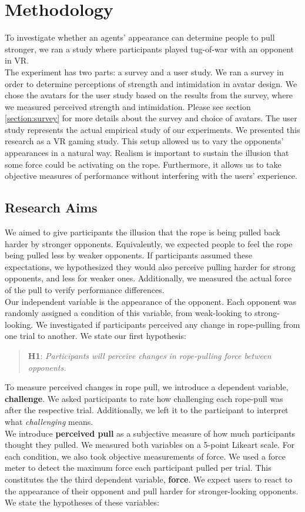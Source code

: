 
\section{Methodology}
\label{section:methodology}
To investigate whether an agents' appearance can determine people to pull stronger, we ran a study where participants played tug-of-war with an opponent in VR.\\
The experiment has two parts: a survey and a user study. We ran a survey in order to determine perceptions of strength and intimidation in avatar design. We chose the avatars for the user study based on the results from the survey, where we measured perceived strength and intimidation. Please see section \ref{section:survey} for more details about the survey and choice of avatars. The user study represents the actual empirical study of our experiments. We presented this research as a VR gaming study. This setup allowed us to vary the opponents' appearances in a natural way. Realism is important to sustain the illusion that some force could be activating on the rope. Furthermore, it allows us to take objective measures of performance without interfering with the users' experience.

\subsection{Research Aims}
We aimed to give participants the illusion that the rope is being pulled back harder by stronger opponents. Equivalently, we expected people to feel the rope being pulled less by weaker opponents. If participants assumed these expectations, we hypothesized they would also perceive pulling harder for strong opponents, and less for weaker ones. Additionally, we measured the actual force of the pull to verify performance differences.
 \\
Our independent variable is the appearance of the opponent. Each opponent was randomly assigned a condition of this variable, from weak-looking to strong-looking. We investigated if participants perceived any change in rope-pulling from one trial to another. We state our first hypothesis:
\begin{quote}
\textbf{H1}: \textit{Participants will perceive changes in rope-pulling force between opponents.}
\end{quote}
To measure perceived changes in rope pull, we introduce a dependent variable, \textbf{challenge}. We asked participants to rate how challenging each rope-pull was after the respective trial. Additionally, we left it to the participant to interpret what \textit{challenging} means.\\ 
We introduce \textbf{perceived pull} as a subjective measure of how much participants thought they pulled. We measured both variables on a 5-point Likeart scale. For each condition, we also took objective measurements of force. We used a force meter to detect the maximum force each participant pulled per trial. This constitutes the the third dependent variable, \textbf{force}. We expect users to react to the appearance of their opponent and pull harder for stronger-looking opponents. We state the hypotheses of these variables:\\

